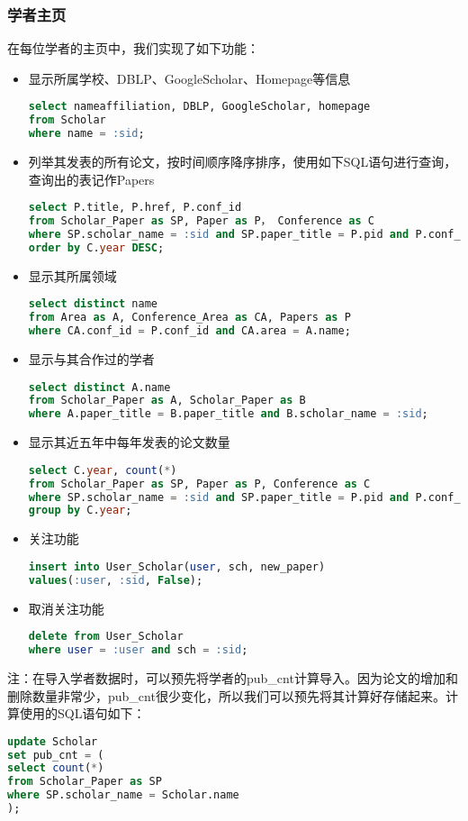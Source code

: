 \subsubsection{学者主页}
\label{sec:scholar}
在每位学者的主页中，我们实现了如下功能：
\begin{itemize}
\item 显示所属学校、DBLP、GoogleScholar、Homepage等信息
\begin{lstlisting}[language=SQL]
select nameaffiliation, DBLP, GoogleScholar, homepage
from Scholar
where name = :sid;
\end{lstlisting}
\item 列举其发表的所有论文，按时间顺序降序排序，使用如下SQL语句进行查询，查询出的表记作Papers
\begin{lstlisting}[language=SQL]
select P.title, P.href, P.conf_id
from Scholar_Paper as SP, Paper as P， Conference as C
where SP.scholar_name = :sid and SP.paper_title = P.pid and P.conf_id = C.cid
order by C.year DESC;
\end{lstlisting}
\item 显示其所属领域
\begin{lstlisting}[language=SQL]
select distinct name
from Area as A, Conference_Area as CA, Papers as P
where CA.conf_id = P.conf_id and CA.area = A.name;
\end{lstlisting}
\item 显示与其合作过的学者
\begin{lstlisting}[language=SQL]
select distinct A.name
from Scholar_Paper as A, Scholar_Paper as B
where A.paper_title = B.paper_title and B.scholar_name = :sid;
\end{lstlisting}
\item 显示其近五年中每年发表的论文数量
\begin{lstlisting}[language=SQL]
select C.year, count(*)
from Scholar_Paper as SP, Paper as P, Conference as C
where SP.scholar_name = :sid and SP.paper_title = P.pid and P.conf_id = C.cid
group by C.year;
\end{lstlisting}
\item 关注功能
\begin{lstlisting}[language=SQL]
insert into User_Scholar(user, sch, new_paper)
values(:user, :sid, False);
\end{lstlisting}
\item 取消关注功能
\begin{lstlisting}[language=SQL]
delete from User_Scholar
where user = :user and sch = :sid;
\end{lstlisting}
\end{itemize}
注：在导入学者数据时，可以预先将学者的pub\_cnt计算导入。因为论文的增加和删除数量非常少，pub\_cnt很少变化，所以我们可以预先将其计算好存储起来。计算使用的SQL语句如下：
\begin{lstlisting}[language=SQL]
update Scholar
set pub_cnt = (
select count(*)
from Scholar_Paper as SP
where SP.scholar_name = Scholar.name
);
\end{lstlisting}

